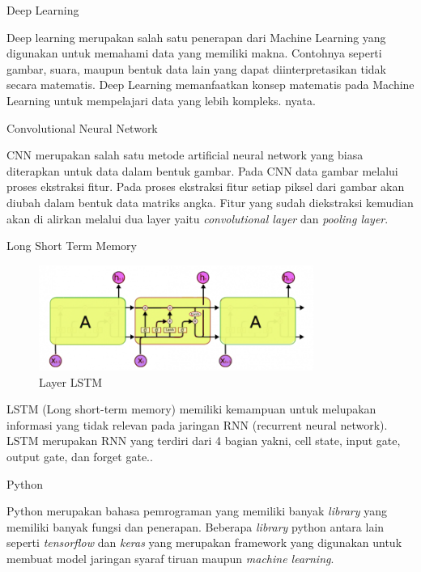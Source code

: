 \documentclass[t]{beamer}
\begin{document}
\begin{frame}{Deep Learning}
	\par Deep learning merupakan salah satu penerapan dari Machine Learning yang digunakan untuk memahami data yang memiliki makna. Contohnya seperti gambar, suara, maupun bentuk data lain yang dapat diinterpretasikan tidak secara matematis. Deep Learning memanfaatkan konsep matematis pada Machine Learning untuk mempelajari data yang lebih kompleks. nyata.\cite{goodfellow2016deep}
\end{frame}
\begin{frame}{Convolutional Neural Network}
	\par CNN merupakan salah satu metode artificial neural network yang biasa diterapkan untuk data dalam bentuk gambar. Pada CNN data gambar melalui proses ekstraksi fitur. Pada proses ekstraksi fitur setiap piksel dari gambar akan diubah dalam bentuk data matriks angka. Fitur yang sudah diekstraksi kemudian akan di alirkan melalui dua layer yaitu \textit{convolutional layer} dan \textit{pooling layer}.
\end{frame}
\begin{frame}{Long Short Term Memory}
	\begin{figure}[H]
		\centering
		\includegraphics[width=0.8\textwidth]{public/assets/img/LSTM1.png}
		\caption{Layer LSTM}
		\label{fig:lstm1}
	\end{figure}
	\par LSTM (Long short-term memory) memiliki kemampuan untuk melupakan informasi yang tidak relevan pada jaringan RNN (recurrent neural network). LSTM merupakan RNN yang terdiri dari 4 bagian yakni, cell state, input gate, output gate, dan forget gate..
\end{frame}
\begin{frame}{Python}
	\par Python merupakan bahasa pemrograman yang memiliki banyak \textit{library} yang memiliki banyak fungsi dan penerapan. Beberapa \textit{library} python antara lain seperti \textit{tensorflow} dan \textit{keras} yang merupakan framework yang digunakan untuk membuat model jaringan syaraf tiruan maupun \textit{machine learning}.
\end{frame}
\end{document}
